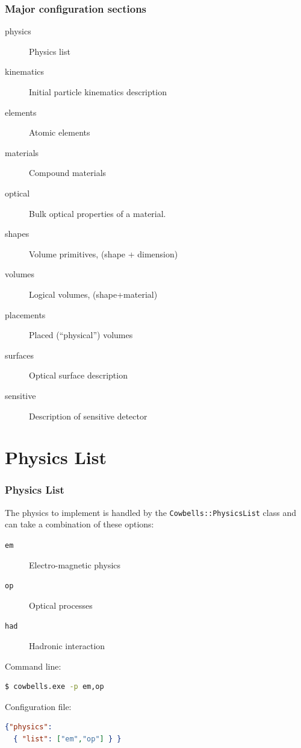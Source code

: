 \documentclass[xcolor=dvipsnames]{beamer}
\begin{document}
\begin{frame}
  \frametitle{Major configuration sections}
  \begin{description}
  \item[physics] Physics list
  \item[kinematics] Initial particle kinematics description
  \item[elements] Atomic elements
  \item[materials] Compound materials
  \item[optical] Bulk optical properties of a material.
  \item[shapes] Volume primitives, (shape + dimension)
  \item[volumes] Logical volumes, (shape+material)
  \item[placements] Placed (``physical'') volumes
  \item[surfaces] Optical surface description
  \item[sensitive] Description of sensitive detector
  \end{description}

\end{frame}

\section{Physics List}

\begin{frame}[fragile]
  \frametitle{Physics List}
  
  The physics to implement is handled by the \texttt{Cowbells::PhysicsList} class and can take a combination of these options:

  \begin{description}
  \item[\texttt{em}] Electro-magnetic physics 
  \item[\texttt{op}] Optical processes
  \item[\texttt{had}] Hadronic interaction
  \end{description}

  Command line:
  \begin{lstlisting}[language=sh]
$ cowbells.exe -p em,op    
  \end{lstlisting}

Configuration file:
\begin{lstlisting}[language=json,firstnumber=1]
{"physics": 
  { "list": ["em","op"] } }  
\end{lstlisting}
\end{frame}
\end{document}
